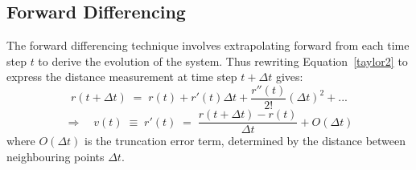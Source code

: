 \documentclass[namedreferences]{SolarPhysics}
\begin{document}
\begin{article}
\subsection{Forward Differencing} %
\label{sect_forward}

The forward differencing technique involves extrapolating forward from each time step $t$ to derive the evolution of the system. Thus rewriting Equation~\ref{taylor2} to express the distance measurement at time step $t+\Delta t$ gives:
\begin{equation}
r(t + \Delta t) \; = \; r(t) + r'(t)\Delta t +  \frac{r''(t)}{2!}(\Delta t)^{2} + ...
\end{equation}
\begin{equation}
\Rightarrow \quad v(t) \; \equiv \; r'(t) \; = \; \frac{r(t + \Delta t) - r(t)}{\Delta t} + O(\Delta t)
\end{equation}
where $O(\Delta t)$ is the truncation error term, determined by the distance between neighbouring points $\Delta t$. %

\end{article}
\end{document}
